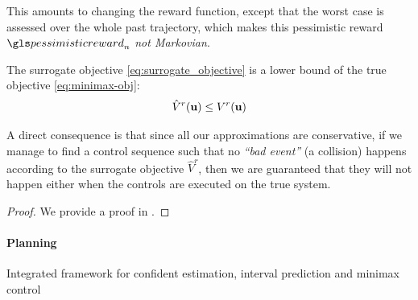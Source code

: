 This amounts to changing the reward function, except that the worst case is assessed over the whole past trajectory, which makes this pessimistic reward $\pessimisticreward_n$ \emph{not Markovian}.

\begin{proposition}
	\label{prop:lower-bound}
	\begin{leftbar}[propositionbar]
	The surrogate objective  \eqref{eq:surrogate_objective} is a lower bound of the true objective  \eqref{eq:minimax-obj}: 
	\begin{equation*}
	\hat{V}^r(\mathbf{u}) \leq V^r(\mathbf{u})
	\end{equation*}
	\end{leftbar}
\end{proposition}
A direct consequence is that since all our approximations are conservative, if we manage to find a control sequence such that no \emph{\enquote{bad event}} (\eg a collision) happens according to the surrogate objective $\hat{V}^r$, then we are guaranteed that they will not happen either when the controls are executed on the true system.
\begin{proof}
	We provide a proof in .
\end{proof}

\paragraph{Planning}

\begin{algorithm}[t]
	\DontPrintSemicolon
	\caption{Integrated framework for confident estimation, interval prediction and minimax control}
	\label{alg:full}
	
	
\end{algorithm}

